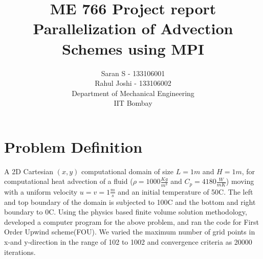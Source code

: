\documentclass{report}
\author{Saran S - 133106001 \\ Rahul Joshi - 133106002 \\ Department of Mechanical Engineering \\ IIT Bombay}
\title{ME 766 Project report \\ Parallelization of Advection Schemes using MPI}
\begin{document}
\maketitle
\section*{Problem Definition}
A 2D Cartesian $(x,y)$ computational domain of size $L=1m$ and $H=1m$, for computational heat advection of a fluid ($\rho=1000\frac{Kg}{m^3}$ and $C_p=4180\frac{W}{mK}$) moving with a uniform velocity $u=v=1\frac{m}{s}$ and an initial temperature of 50C. The left and top boundary of the domain is subjected to 100C and the bottom and right boundary to 0C. Using the physics based finite volume solution methodology, developed a computer program for the above problem, and ran the code for First Order Upwind scheme(FOU). We varied the maximum number of grid points in x-and y-direction in the range of 102 to 1002 and convergence criteria as 20000 iterations.
\end{document}
